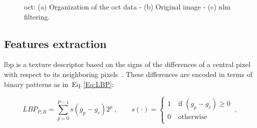\begin{figure}[t]
  \centering
  \hspace*{\fill}
   \hfill
   \hfill
  \hspace*{\fill}
  \caption{\ac{oct}: (a) Organization of the \ac{oct} data - (b) Original image - (c) \ac{nlm} filtering.}
  \label{fig:denoise}
\end{figure}

\subsection{Features extraction}\label{subsec:feaext}

\ac{lbp} is a texture descriptor based on the signs of the differences of a central pixel with respect to its neighboring pixels~\cite{ojala2002multiresolution}. 
These differences are encoded in terms of binary patterns as in~Eq.\,\eqref{Eq:LBP}: 

\begin{equation}\label{Eq:LBP}
LBP_{P,R} = \sum_{p=0}^{P-1}s(g_{p} - g_{c})2^{p} \ , \qquad s(\cdot) = \begin{cases}
    1  & \ \text{if } (g_{p} - g_{c}) \geq 0\\
    0  & \ \text{otherwise}\\
  \end{cases} \ ,
\end{equation}

